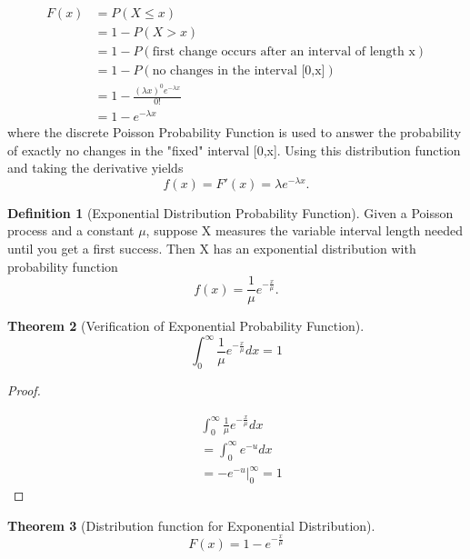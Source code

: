 \documentclass[10pt,]{book}
\theoremstyle{plain}
\newtheorem{theorem}{Theorem}[section]
\theoremstyle{definition}
\newtheorem{definition}[theorem]{Definition}
\theoremstyle{definition}
\theoremstyle{definition}
\numberwithin{equation}{section}
\newcommand{\gt}{ > }
\begin{document}
\begin{align*}
F(x)&  = P(X \le x)\\
 & = 1 - P(X \gt x)\\
 & = 1 - P(\text{first change occurs after an interval of length x})\\
 & = 1 - P(\text{no changes in the interval [0,x]})\\
 & = 1 - \frac{(\lambda x)^0 e^{-\lambda x}}{0!}\\
 & = 1 - e^{-\lambda x}
\end{align*}
where the discrete Poisson Probability Function is used to answer the probability of exactly no changes in the "fixed" interval [0,x]. Using this distribution function and taking the derivative yields
\begin{equation*}f(x) = F'(x) = \lambda e^{-\lambda x}.\end{equation*}
%
\begin{definition}[{Exponential Distribution Probability Function}]\label{definition-29}
Given a Poisson process and a constant \(\mu\), suppose X measures the variable interval length needed until you get a first success.  Then X has an exponential distribution with probability function
		\begin{equation*}f(x) = \frac{1}{\mu} e^{-\frac{x}{\mu}}.\end{equation*}
\end{definition}
\begin{theorem}[{Verification of Exponential Probability Function}]\label{theorem-48}
\begin{equation*}\int_0^{\infty} \frac{1}{\mu} e^{-\frac{x}{\mu}} dx = 1\end{equation*}\end{theorem}
\begin{proof}\hypertarget{proof-47}{}

		\begin{align*}
 & \int_0^{\infty} \frac{1}{\mu} e^{-\frac{x}{\mu}} dx\\
 & = \int_0^{\infty} e^{-u} dx\\
 & = -e^{-u} \big |_0^{\infty} = 1
\end{align*}
\end{proof}
\begin{theorem}[{Distribution function for Exponential Distribution}]\label{theorem-49}
\begin{equation*}F(x) = 1 - e^{-\frac{x}{\mu}}\end{equation*}\end{theorem}
\end{document}

